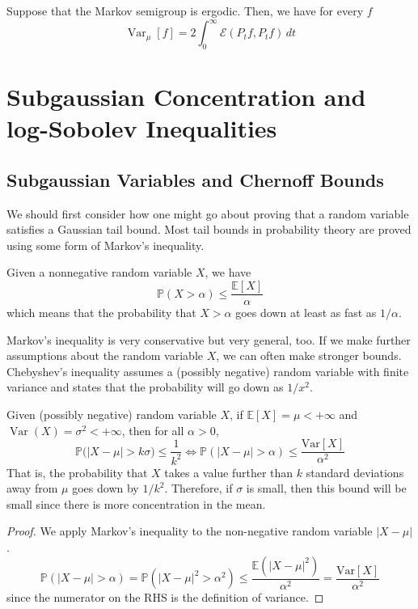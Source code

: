 \documentclass{article}
\DeclareMathOperator{\Var}{Var}
\begin{document}
  \begin{theorem}
  Suppose that the Markov semigroup is ergodic. Then, we have for every $f$ 
  \[\Var_\mu [f] = 2 \int_0^\infty \mathcal{E}(P_t f, P_t f) \, dt\]
  \end{theorem}

\section{Subgaussian Concentration and log-Sobolev Inequalities}

  \subsection{Subgaussian Variables and Chernoff Bounds}

  We should first consider how one might go about proving that a random variable satisfies a Gaussian tail bound. Most tail bounds in probability theory are proved using some form of Markov's inequality. 
  \begin{lemma}
  Given a nonnegative random variable $X$, we have 
  \[\mathbb{P}(X > \alpha) \leq \frac{\mathbb{E}[X]}{\alpha}\]
  which means that the probability that $X > \alpha$ goes down at least as fast as $1/\alpha$. 
  \end{lemma}

  Markov's inequality is very conservative but very general, too. If we make further assumptions about the random variable $X$, we can often make stronger bounds. Chebyshev's inequality assumes a (possibly negative) random variable with finite variance and states that the probability will go down as $1/x^2$. 

  \begin{theorem}
  Given (possibly negative) random variable $X$, if $\mathbb{E}[X] = \mu < +\infty$ and $\Var(X) = \sigma^2 < +\infty$, then for all $\alpha > 0$, 
  \[\mathbb{P} \big( |X - \mu| > k \sigma \big) \leq \frac{1}{k^2} \iff \mathbb{P}(|X - \mu| > \alpha) \leq \frac{\mathrm{Var}[X]}{\alpha^2}\]
  That is, the probability that $X$ takes a value further than $k$ standard deviations away from $\mu$ goes down by $1/k^2$. Therefore, if $\sigma$ is small, then this bound will be small since there is more concentration in the mean. 
  \end{theorem}
  \begin{proof}
  We apply Markov's inequality to the non-negative random variable $|X - \mu|$. 
  \[\mathbb{P}(|X - \mu| > \alpha) = \mathbb{P}(|X - \mu|^2 > \alpha^2) \leq \frac{\mathbb{E}(|X - \mu|^2)}{\alpha^2} = \frac{\mathrm{Var}[X]}{\alpha^2}\]
  since the numerator on the RHS is the definition of variance. 
  \end{proof}
\end{document}

